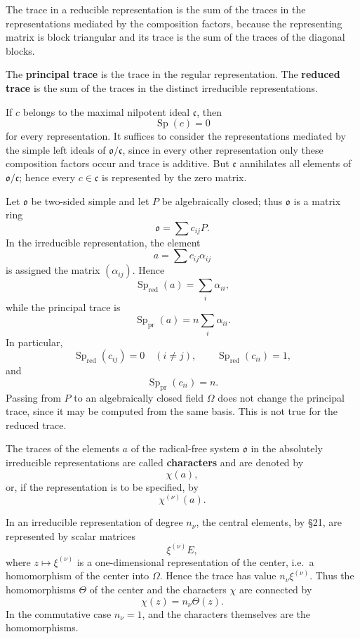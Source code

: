 \documentclass[
  11pt,
]{article}
\begin{document}
The trace in a reducible representation is the sum of the traces in the
representations mediated by the composition factors, because the
representing matrix is block triangular and its trace is the sum of the
traces of the diagonal blocks.

The \textbf{principal trace} is the trace in the regular representation.
The \textbf{reduced trace} is the sum of the traces in the distinct
irreducible representations.

If \(c\) belongs to the maximal nilpotent ideal \(\mathfrak c\), then \[
  \operatorname{Sp}(c)=0
\] for every representation. It suffices to consider the representations
mediated by the simple left ideals of \(\mathfrak{o}/\mathfrak c\),
since in every other representation only these composition factors occur
and trace is additive. But \(\mathfrak c\) annihilates all elements of
\(\mathfrak{o}/\mathfrak c\); hence every \(c\in\mathfrak c\) is
represented by the zero matrix.

Let \(\mathfrak{o}\) be two-sided simple and let \(P\) be algebraically
closed; thus \(\mathfrak{o}\) is a matrix ring \[
  \mathfrak{o}=\sum c_{ij}P.
\] In the irreducible representation, the element \[
  a=\sum c_{ij}\alpha_{ij}
\] is assigned the matrix \((\alpha_{ij})\). Hence \[
  \operatorname{Sp}_{\mathrm{red}}(a)=\sum_i\alpha_{ii},
\] while the principal trace is \[
  \operatorname{Sp}_{\mathrm{pr}}(a)=n\sum_i\alpha_{ii}.
\] In particular, \[
  \operatorname{Sp}_{\mathrm{red}}(c_{ij})=0\quad(i\ne j),
  \qquad
  \operatorname{Sp}_{\mathrm{red}}(c_{ii})=1,
\] and \[
  \operatorname{Sp}_{\mathrm{pr}}(c_{ii})=n.
\] Passing from \(P\) to an algebraically closed field \(\Omega\) does
not change the principal trace, since it may be computed from the same
basis. This is not true for the reduced trace.

The traces of the elements \(a\) of the radical-free system
\(\mathfrak{o}\) in the absolutely irreducible representations are
called \textbf{characters} and are denoted by \[
  \chi(a),
\] or, if the representation is to be specified, by \[
  \chi^{(\nu)}(a).
\]

In an irreducible representation of degree \(n_\nu\), the central
elements, by §21, are represented by scalar matrices \[
  \xi^{(\nu)}E,
\] where \(z\mapsto \xi^{(\nu)}\) is a one-dimensional representation of
the center, i.e.~a homomorphism of the center into \(\Omega\). Hence the
trace has value \(n_\nu\xi^{(\nu)}\). Thus the homomorphisms \(\Theta\)
of the center and the characters \(\chi\) are connected by \[
  \chi(z)=n_\nu\Theta(z).
\] In the commutative case \(n_\nu=1\), and the characters themselves
are the homomorphisms.
\end{document}
